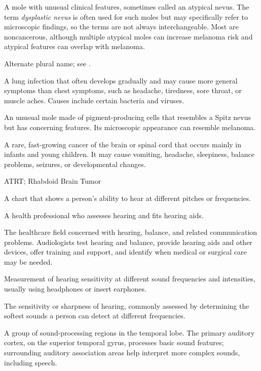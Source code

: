  A mole with unusual clinical features, sometimes called an atypical nevus. The term \textit{dysplastic nevus} is often used for such moles but may specifically refer to microscopic findings,
so the terms are not always interchangeable.
Most are noncancerous, although multiple atypical moles can increase melanoma risk
and atypical features can overlap with melanoma.

 Alternate plural name; see .

 A lung infection that often develops gradually and may cause more general symptoms than chest symptoms, such as headache, tiredness, sore throat, or muscle aches. Causes include certain bacteria and viruses.

 An unusual mole made of pigment-producing cells that resembles a Spitz nevus but has concerning features. Its microscopic appearance can resemble melanoma.

 A rare, fast-growing cancer of the brain or spinal cord that occurs mainly in infants and young children. It may cause vomiting, headache, sleepiness, balance problems, seizures, or developmental changes.

\synonyms
ATRT; Rhabdoid Brain Tumor

 A chart that shows a person’s ability to hear at different pitches or frequencies.

 A health professional who assesses hearing and fits hearing aids.

 The healthcare field concerned with hearing, balance, and related communication problems. Audiologists test hearing and balance, provide hearing aids and other devices, offer training and support, and identify when medical or surgical care may be needed.

 Measurement of hearing sensitivity at different sound frequencies and intensities, usually using headphones or insert earphones.

 The sensitivity or sharpness of hearing, commonly assessed by determining the softest sounds a person can detect at different frequencies.

 A group of sound-processing regions in the temporal lobe. The primary auditory cortex, on the superior temporal gyrus, processes basic sound features; surrounding auditory association areas help interpret more complex sounds, including speech.


